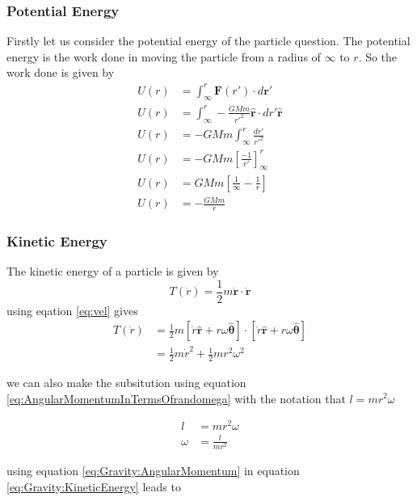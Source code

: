 \subsubsection{Potential Energy}
Firstly let us consider the potential energy of the particle question. The potential energy is the work done in moving the particle from a radius of $\infty$ to $r$.
So the work done is given by
\begin{align}
U(r)&=\int_{\infty}^{r} \bm{F}(r') \cdot d\bm{r}'  \nonumber \\
U(r)&=\int_{\infty}^{r} -\frac{GMm}{r'^2} \hat{\bm{r}} \cdot dr' \hat{\bm{r}}  \nonumber \\
U(r)&=-GMm\int_{\infty}^{r} \frac{dr'}{r'^2} \nonumber \\
U(r)&=-GMm \left[ \frac{-1}{r'} \right]_{\infty}^{r} \nonumber \\
U(r)&=GMm \left[ \frac{1}{\infty} - \frac{1}{r} \right] \nonumber \\
U(r)&=- \frac{GMm}{r} \label{eq:potentialEnergy}
\end{align}

\subsubsection{Kinetic Energy}
The kinetic energy of a particle is given by
\begin{equation}
T(\dot{r})=\frac{1}{2}m\dot{\bm{r}}\cdot\dot{\bm{r}} \label{eq:KineticEnergy}
\end{equation}
using eqation \ref{eq:vel} gives 
\begin{align}
T(\dot{r})&=\frac{1}{2}m\left[ \dot{r}\hat{\bm{r}}+r\omega\hat{\bm{\theta}}\right]\cdot\left[ \dot{r}\hat{\bm{r}}+r\omega\hat{\bm{\theta}}\right] \nonumber \\
&=\frac{1}{2}m \dot{r}^2 + \frac{1}{2}mr^2 \omega^2 \label{eq:Gravity:KineticEnergy}
\end{align}

we can also make the subsitution using equation \ref{eq:AngularMomentumInTermsOfrandomega} with the notation that $l=mr^2\omega$

\begin{align}
l&=mr^2\omega \nonumber \\
\omega&=\frac{l}{mr^2} \label{eq:Gravity:AngularMomentum}
\end{align}

using equation \ref{eq:Gravity:AngularMomentum} in equation \ref{eq:Gravity:KineticEnergy} leads to

